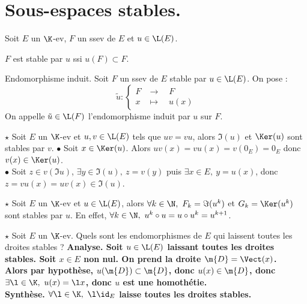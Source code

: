 \documentclass[11pt]{article}
\begin{document}
\section{Sous-espaces stables.}

\begin{defi}{}{}
    Soit $E$ un $\K$-ev, $F$ un ssev de $E$ et $u\in\L(E)$.
    \begin{center}
        $F$ est stable par $u$ ssi $u(F)\subset F$.
    \end{center}
\end{defi}

\begin{defi}{Endomorphisme induit.}{}
    Soit $F$ un ssev de $E$ stable par $u\in\L(E)$. On pose :
    \begin{equation*}
        \tilde{u} : \begin{cases}
            F & \to \quad F\\
            x & \mapsto \quad u(x)
        \end{cases}
    \end{equation*}
    On appelle $\tilde{u}\in\L(F)$ l'endomorphisme induit par $u$ sur $F$.
\end{defi}

\vspace*{-0.4cm}

\begin{prop}{$\star$}{}
    Soit $E$ un $\K$-ev et $u,v\in\L(E)$ tels que $uv=vu$, alors $\Im(u)$ et $\Ker(u)$ sont stables par $v$.
    \tcblower
    $\bullet$ Soit $x\in\Ker(u)$. Alors $uv(x)=vu(x)=v(0_E)=0_E$ donc $v(x)\in\Ker(u)$.\\
    $\bullet$ Soit $z\in v(\Im u)$, $\exists y \in \Im(u), ~ z=v(y)$ puis $\exists x \in E, ~ y=u(x)$, donc $z=vu(x)=uv(x)\in\Im(u)$.
\end{prop}

\vspace*{-0.4cm}

\begin{corr}{$\star$}{}
    Soit $E$ un $\K$-ev et $u\in \L(E)$, alors $\forall k \in \N, ~ F_k=\Im(u^k)$ et $G_k=\Ker(u^k)$ sont stables par $u$.
    \tcblower
    En effet, $\forall k \in \N, ~ u^k\circ u = u \circ u^k = u^{k+1}$.
\end{corr}

\vspace*{-0.4cm}

\begin{exi}{$\star$}{}
    Soit $E$ un $\K$-ev. Quels sont les endomorphismes de $E$ qui laissent toutes les droites stables ?
    \tcblower
    \bf{Analyse.} Soit $u\in\L(E)$ laissant toutes les droites stables. Soit $x\in E$ non nul. On prend la droite $\m{D}=\Vect(x)$.\\
    Alors par hypothèse, $u(\m{D})\subset\m{D}$, donc $u(x)\in\m{D}$, donc $\exists \l \in \K, ~ u(x)=\l x$, donc $u$ est une homothétie.\\
    \bf{Synthèse.} $\forall \l \in \K, ~ \l\id_E$ laisse toutes les droites stables.
\end{exi}
\end{document}

